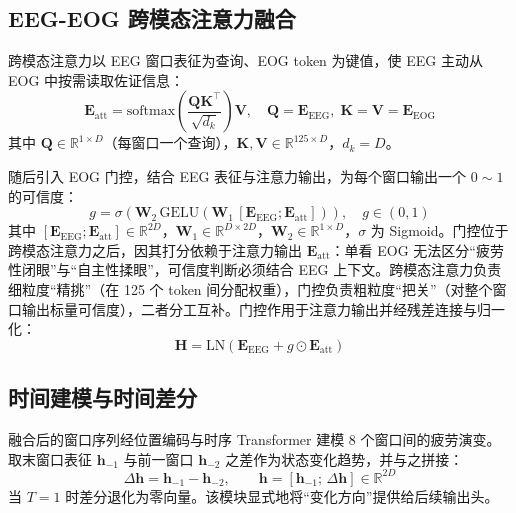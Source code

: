 \documentclass[11pt,a4paper]{ctexart}
\begin{document}
\subsection{EEG-EOG 跨模态注意力融合}
跨模态注意力以 EEG 窗口表征为查询、EOG token 为键值，使 EEG 主动从 EOG 中按需读取佐证信息：
\begin{equation}
\mathbf{E}_{\text{att}} = \mathrm{softmax}\!\left(\frac{\mathbf{Q}\mathbf{K}^{\top}}{\sqrt{d_k}}\right)\mathbf{V},\quad \mathbf{Q}\!=\!\mathbf{E}_{\text{EEG}},\;\mathbf{K}\!=\!\mathbf{V}\!=\!\mathbf{E}_{\text{EOG}}
\label{eq:attn}
\end{equation}
其中 $\mathbf{Q}\in\mathbb{R}^{1\times D}$（每窗口一个查询），$\mathbf{K},\mathbf{V}\in\mathbb{R}^{125\times D}$，$d_k=D$。

随后引入 EOG 门控，结合 EEG 表征与注意力输出，为每个窗口输出一个 $0\!\sim\!1$ 的可信度：
\begin{equation}
g = \sigma\!\left(\mathbf{W}_2\,\mathrm{GELU}\!\left(\mathbf{W}_1\,[\mathbf{E}_{\text{EEG}};\mathbf{E}_{\text{att}}]\right)\right),\quad g\in(0,1)
\label{eq:gate}
\end{equation}
其中 $[\mathbf{E}_{\text{EEG}};\mathbf{E}_{\text{att}}]\in\mathbb{R}^{2D}$，$\mathbf{W}_1\in\mathbb{R}^{D\times 2D}$，$\mathbf{W}_2\in\mathbb{R}^{1\times D}$，$\sigma$ 为 Sigmoid。门控位于跨模态注意力之后，因其打分依赖于注意力输出 $\mathbf{E}_{\text{att}}$：单看 EOG 无法区分``疲劳性闭眼''与``自主性揉眼''，可信度判断必须结合 EEG 上下文。跨模态注意力负责细粒度``精挑''（在 125 个 token 间分配权重），门控负责粗粒度``把关''（对整个窗口输出标量可信度），二者分工互补。门控作用于注意力输出并经残差连接与归一化：
\begin{equation}
\mathbf{H} = \mathrm{LN}\!\left(\mathbf{E}_{\text{EEG}} + g\odot\mathbf{E}_{\text{att}}\right)
\label{eq:add}
\end{equation}

\subsection{时间建模与时间差分}
融合后的窗口序列经位置编码与时序 Transformer 建模 8 个窗口间的疲劳演变。取末窗口表征 $\mathbf{h}_{-1}$ 与前一窗口 $\mathbf{h}_{-2}$ 之差作为状态变化趋势，并与之拼接：
\begin{equation}
\Delta\mathbf{h} = \mathbf{h}_{-1} - \mathbf{h}_{-2},\qquad \mathbf{h} = [\mathbf{h}_{-1};\,\Delta\mathbf{h}]\in\mathbb{R}^{2D}
\label{eq:delta}
\end{equation}
当 $T=1$ 时差分退化为零向量。该模块显式地将``变化方向''提供给后续输出头。
\end{document}
